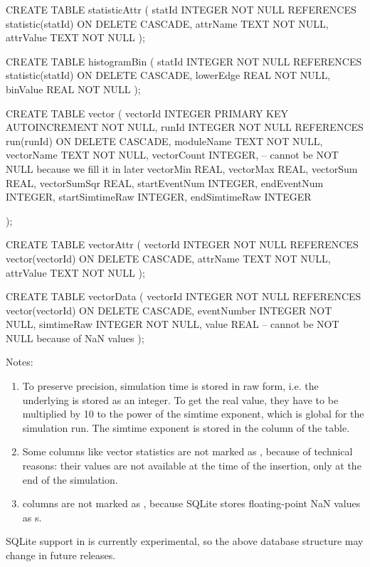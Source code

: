 \begin{filelisting}
CREATE TABLE statisticAttr
(
    statId        INTEGER NOT NULL REFERENCES statistic(statId) ON DELETE CASCADE,
    attrName      TEXT NOT NULL,
    attrValue     TEXT NOT NULL
);

CREATE TABLE histogramBin
(
    statId        INTEGER NOT NULL REFERENCES statistic(statId) ON DELETE CASCADE,
    lowerEdge     REAL NOT NULL,
    binValue      REAL NOT NULL
);

CREATE TABLE vector
(
    vectorId        INTEGER PRIMARY KEY AUTOINCREMENT NOT NULL,
    runId           INTEGER NOT NULL REFERENCES run(runId) ON DELETE CASCADE,
    moduleName      TEXT NOT NULL,
    vectorName      TEXT NOT NULL,
    vectorCount     INTEGER,    -- cannot be NOT NULL because we fill it in later
    vectorMin       REAL,
    vectorMax       REAL,
    vectorSum       REAL,
    vectorSumSqr    REAL,
    startEventNum   INTEGER,
    endEventNum     INTEGER,
    startSimtimeRaw INTEGER,
    endSimtimeRaw   INTEGER

);

CREATE TABLE vectorAttr
(
    vectorId      INTEGER  NOT NULL REFERENCES vector(vectorId) ON DELETE CASCADE,
    attrName      TEXT NOT NULL,
    attrValue     TEXT NOT NULL
);

CREATE TABLE vectorData
(
    vectorId      INTEGER NOT NULL REFERENCES vector(vectorId) ON DELETE CASCADE,
    eventNumber   INTEGER NOT NULL,
    simtimeRaw    INTEGER NOT NULL,
    value         REAL  -- cannot be NOT NULL because of NaN values
);
\end{filelisting}

Notes:

\begin{enumerate}
  \item To preserve precision, simulation time is stored in raw form, i.e.
        the underlying  is stored as an integer. To get the real
        value, they have to be multiplied by 10 to the power of the simtime
        exponent, which is global for the simulation run. The simtime
        exponent is stored  in the  column of the 
        table.
  \item Some columns like vector statistics are not marked as ,
        because of technical reasons: their values are not available at the
        time of the insertion, only at the end of the simulation.
  \item {} columns are not marked as , because
        SQLite stores floating-point NaN values as s.
\end{enumerate}

\begin{caution}
SQLite support in {\opp} is currently experimental, so the above database
structure may change in future releases.
\end{caution}

